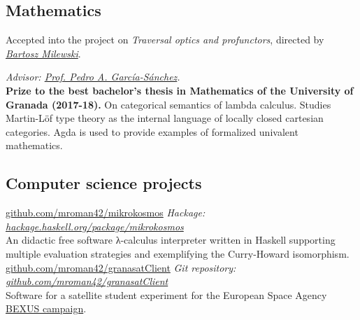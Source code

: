 \documentclass[nocolors]{friggeri-cv-a4}
\begin{document}
\subsection{Mathematics}

\begin{entrylist}
  { Accepted into the project on
    \textit{Traversal optics and profunctors}, directed by \textit{\href{https://bartoszmilewski.com/2019/01/05/act2019-school-call-for-participation/}{Bartosz Milewski}}.
  }
  
  { {\small \textit{Advisor: \href{https://scholar.google.es/citations?user=gvq9UmMAAAAJ&hl=en&oi=ao}{Prof. Pedro A. García-Sánchez}.}} \\
    \textbf{Prize to the best bachelor's thesis in Mathematics of the University of Granada (2017-18).}
    On categorical semantics of lambda calculus. Studies
    Martin-Löf type theory as the internal language of locally closed
    cartesian categories. Agda is used to provide examples of formalized univalent mathematics.
   }

   


\end{entrylist}

\newpage
\subsection{Computer science projects}



\begin{entrylist}
{\href{https://github.com/mroman42/mikrokosmos}{github.com/mroman42/mikrokosmos}}
{\emph{Hackage: \href{https://hackage.haskell.org/package/mikrokosmos}{hackage.haskell.org/package/mikrokosmos}} \\
  An didactic free software λ-calculus interpreter written in Haskell supporting multiple evaluation strategies and exemplifying the Curry-Howard isomorphism.
}
{\href{https://github.com/mroman42/granasatClient}{github.com/mroman42/granasatClient}}
{\emph{Git repository: \href{https://github.com/mroman42/granasatClient}{github.com/mroman42/granasatClient}} \\
  Software for a satellite student experiment for the
  European Space Agency \href{http://rexusbexus.net/}{BEXUS campaign}.
}
\end{entrylist}
\end{document}
